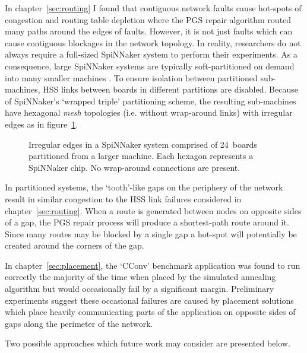 			In chapter~\ref{sec:routing} I found that contiguous network faults cause
			hot-spots of congestion and routing table depletion where the PGS repair
			algorithm routed many paths around the edges of faults.  However, it is
			not just faults which can cause contiguous blockages in the network
			topology. In reality, researchers do not always require a full-sized
			SpiNNaker system to perform their experiments. As a consequence, large
			SpiNNaker systems are typically soft-partitioned on demand into many
			smaller machines \cite{spalloc16}. To ensure isolation between
			partitioned sub-machines, HSS links between boards in different
			partitions are disabled. Because of SpiNNaker's `wrapped triple'
			partitioning scheme, the resulting sub-machines have hexagonal
			\emph{mesh} topologies (i.e.  without wrap-around links) with irregular
			edges as in figure~\ref{fig:spalloc-mesh}.
			
			\begin{figure}
				\center
				
				\caption[Irregular edges of a partitioned SpiNNaker system.]%
				{Irregular edges in a SpiNNaker system comprised of 24~boards
				partitioned from a larger machine.  Each hexagon represents a SpiNNaker
				chip. No wrap-around connections are present.}
				\label{fig:spalloc-mesh}
			\end{figure}
			
			In partitioned systems, the `tooth'-like gaps on the periphery of the
			network result in similar congestion to the HSS link failures considered
			in chapter~\ref{sec:routing}. When a route is generated between nodes on
			opposite sides of a gap, the PGS repair process will produce a
			shortest-path route around it. Since many routes may be blocked by a
			single gap a hot-spot will potentially be created around the corners of
			the gap.
			
			In chapter~\ref{sec:placement}, the `CConv' benchmark application was
			found to run correctly the majority of the time when placed by the
			simulated annealing algorithm but would occasionally fail by a
			significant margin. Preliminary experiments suggest these occasional
			failures are caused by placement solutions which place heavily
			communicating parts of the application on opposite sides of gaps along the
			perimeter of the network.
			
			Two possible approaches which future work may consider are presented
			below.
			
